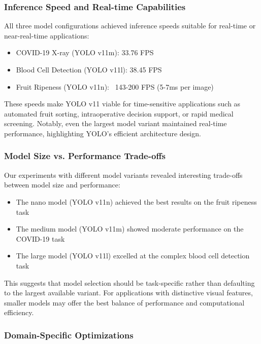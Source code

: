 \begin{multicols}{2}
\subsubsection{Inference Speed and Real-time Capabilities}

All three model configurations achieved inference speeds suitable for real-time or near-real-time applications:

\begin{itemize}
    \item COVID-19 X-ray (YOLO v11m): 33.76 FPS
    \item Blood Cell Detection (YOLO v11l): 38.45 FPS
    \item Fruit Ripeness (YOLO v11n): ~143-200 FPS (5-7ms per image)
\end{itemize}

These speeds make YOLO v11 viable for time-sensitive applications such as automated fruit sorting, intraoperative decision support, or rapid medical screening. Notably, even the largest model variant maintained real-time performance, highlighting YOLO's efficient architecture design.

\subsubsection{Model Size vs. Performance Trade-offs}

Our experiments with different model variants revealed interesting trade-offs between model size and performance:

\begin{itemize}
    \item The nano model (YOLO v11n) achieved the best results on the fruit ripeness task
    \item The medium model (YOLO v11m) showed moderate performance on the COVID-19 task
    \item The large model (YOLO v11l) excelled at the complex blood cell detection task
\end{itemize}

This suggests that model selection should be task-specific rather than defaulting to the largest available variant. For applications with distinctive visual features, smaller models may offer the best balance of performance and computational efficiency.

\subsubsection{Domain-Specific Optimizations}


\end{multicols}
